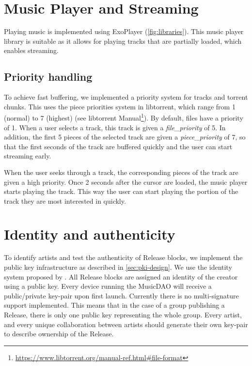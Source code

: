 \section{Music Player and Streaming} 
Playing music is implemented using ExoPlayer (\ref{fig:libraries}). This music player library is suitable as it allows for playing tracks that are partially loaded, which enables streaming.
\subsection{Priority handling}
To achieve fast buffering, we implemented a priority system for tracks and torrent chunks. This uses the piece priorities system in libtorrent, which range from 1 (normal) to 7 (highest) (see libtorrent Manual\footnote{\url{https://www.libtorrent.org/manual-ref.html\#file-format}}). By default, files have a priority of 1. When a user selects a track, this track is given a \textit{file\_priority} of 5. In addition, the first 5  pieces of the selected track are given a \textit{piece\_priority} of 7, so that the first seconds of the track are buffered quickly and the user can start streaming early.

When the user seeks through a track, the corresponding pieces of the track are given a high priority. Once 2 seconds after the cursor are loaded, the music player starts playing the track. This way the user can start playing the portion of the track they are most interested in quickly.

\section{Identity and authenticity}
To identify artists and test the authenticity of Release blocks, we implement the public key infrastructure as described in \ref{sec:pki-design}. We use the identity system proposed by \cite{mattskala2020}. All Release blocks are assigned an identity of the creator using a public key. Every device running the MusicDAO will receive a public/private key-pair upon first launch. Currently there is no multi-signature support implemented. This means that in the case of a group publishing a Release, there is only one public key representing the whole group. Every artist, and every unique collaboration between artists should generate their own key-pair to describe ownership of the Release.


